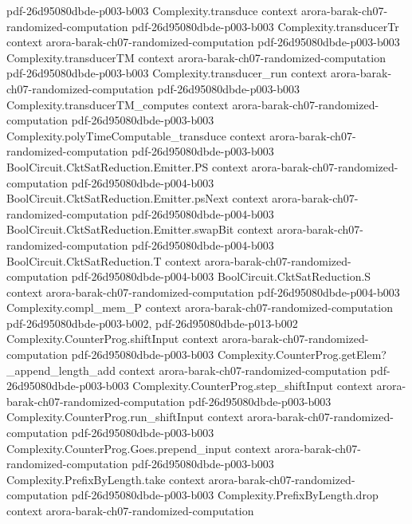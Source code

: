 \begin{theorem}
  {pdf-26d95080dbde-p003-b003}
\proofstep
  {Complexity.transduce}
  {context}
  {arora-barak-ch07-randomized-computation}
  {pdf-26d95080dbde-p003-b003}
\proofstep
  {Complexity.transducerTr}
  {context}
  {arora-barak-ch07-randomized-computation}
  {pdf-26d95080dbde-p003-b003}
\proofstep
  {Complexity.transducerTM}
  {context}
  {arora-barak-ch07-randomized-computation}
  {pdf-26d95080dbde-p003-b003}
\proofstep
  {Complexity.transducer_run}
  {context}
  {arora-barak-ch07-randomized-computation}
  {pdf-26d95080dbde-p003-b003}
\proofstep
  {Complexity.transducerTM_computes}
  {context}
  {arora-barak-ch07-randomized-computation}
  {pdf-26d95080dbde-p003-b003}
\proofstep
  {Complexity.polyTimeComputable_transduce}
  {context}
  {arora-barak-ch07-randomized-computation}
  {pdf-26d95080dbde-p003-b003}
\proofstep
  {BoolCircuit.CktSatReduction.Emitter.PS}
  {context}
  {arora-barak-ch07-randomized-computation}
  {pdf-26d95080dbde-p004-b003}
\proofstep
  {BoolCircuit.CktSatReduction.Emitter.psNext}
  {context}
  {arora-barak-ch07-randomized-computation}
  {pdf-26d95080dbde-p004-b003}
\proofstep
  {BoolCircuit.CktSatReduction.Emitter.swapBit}
  {context}
  {arora-barak-ch07-randomized-computation}
  {pdf-26d95080dbde-p004-b003}
\proofstep
  {BoolCircuit.CktSatReduction.T}
  {context}
  {arora-barak-ch07-randomized-computation}
  {pdf-26d95080dbde-p004-b003}
\proofstep
  {BoolCircuit.CktSatReduction.S}
  {context}
  {arora-barak-ch07-randomized-computation}
  {pdf-26d95080dbde-p004-b003}
\proofstep
  {Complexity.compl_mem_P}
  {context}
  {arora-barak-ch07-randomized-computation}
  {pdf-26d95080dbde-p003-b002,
    pdf-26d95080dbde-p013-b002}
\proofstep
  {Complexity.CounterProg.shiftInput}
  {context}
  {arora-barak-ch07-randomized-computation}
  {pdf-26d95080dbde-p003-b003}
\proofstep
  {Complexity.CounterProg.getElem?_append_length_add}
  {context}
  {arora-barak-ch07-randomized-computation}
  {pdf-26d95080dbde-p003-b003}
\proofstep
  {Complexity.CounterProg.step_shiftInput}
  {context}
  {arora-barak-ch07-randomized-computation}
  {pdf-26d95080dbde-p003-b003}
\proofstep
  {Complexity.CounterProg.run_shiftInput}
  {context}
  {arora-barak-ch07-randomized-computation}
  {pdf-26d95080dbde-p003-b003}
\proofstep
  {Complexity.CounterProg.Goes.prepend_input}
  {context}
  {arora-barak-ch07-randomized-computation}
  {pdf-26d95080dbde-p003-b003}
\proofstep
  {Complexity.PrefixByLength.take}
  {context}
  {arora-barak-ch07-randomized-computation}
  {pdf-26d95080dbde-p003-b003}
\proofstep
  {Complexity.PrefixByLength.drop}
  {context}
  {arora-barak-ch07-randomized-computation}

\end{theorem}

